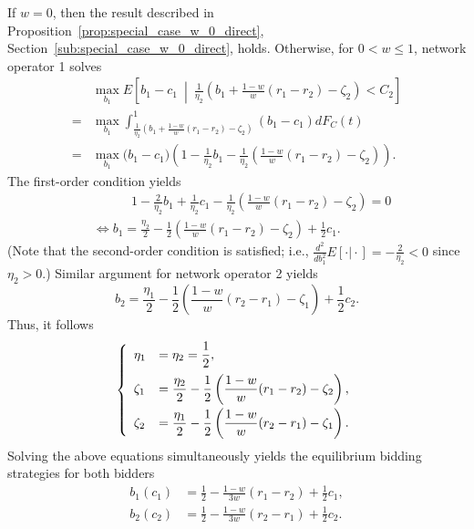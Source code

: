 If $w=0$, then the result described in Proposition~\ref{prop:special_case_w_0_direct}, Section~\ref{sub:special_case_w_0_direct}, holds. Otherwise, for $0<w\le 1$, network operator 1 solves
\begin{align}
	&\max_{b_1} E \left[ b_1-c_1 \:\middle\vert\: \frac{1}{\eta_2}\left( b_1 + \frac{1-w}{w}(r_1-r_2)-\zeta_2 \right) < C_2 \right] \nonumber\\
	= &\max_{b_1}\int_{\frac{1}{\eta_2}(b_1 + \frac{1-w}{w}(r_1-r_2)-\zeta_2)}^{1} (b_1-c_1)dF_C(t)\nonumber\\
	= &\max_{b_1} \bigg(b_1-c_1\bigg) \left(1-\frac{1}{\eta_2}b_1-\frac{1}{\eta_2} \left(\frac{1-w}{w}(r_1-r_2)-\zeta_2 \right) \right).
	\label{eq:pcomp_exp_utility_w_1_direct}
\end{align}
The first-order condition yields
\begin{align}
	&\qquad\quad 1 - \frac{2}{\eta_2}b_1 + \frac{1}{\eta_2}c_1 - \frac{1}{\eta_2}\left( \frac{1-w}{w}(r_1-r_2) - \zeta_2 \right) = 0 \nonumber\\
	&\iff b_1 = \frac{\eta_2}{2} - \frac{1}{2}\left( \frac{1-w}{w}(r_1-r_2) - \zeta_2 \right) + \frac{1}{2}c_1.
\end{align}
(Note that the second-order condition is satisfied; i.e., $\frac{d^2}{db^2_1}E[\cdot\vert\cdot] = -\frac{2}{\eta_2} < 0$ since $\eta_2>0$.) Similar argument for network operator 2 yields
\begin{equation}
	b_2 = \frac{\eta_1}{2} - \frac{1}{2}\left( \frac{1-w}{w}(r_2-r_1) - \zeta_1 \right) + \frac{1}{2}c_2.
\end{equation}
Thus, it follows
\begin{equation}
	\left\{
	\begin{array}{l l}
		\eta_1 &= \eta_2 = \displaystyle\frac{1}{2},\\[2ex]
		\zeta_1 &= \displaystyle\frac{\eta_2}{2} - \displaystyle\frac{1}{2}\left( \displaystyle\frac{1-w}{w}(r_1-r_2) - \zeta_2 \right),\\[2ex]
		\zeta_2 &= \displaystyle\frac{\eta_1}{2} - \displaystyle\frac{1}{2}\left( \displaystyle\frac{1-w}{w}(r_2-r_1) - \zeta_1 \right).
	\end{array}\right.
\end{equation}
Solving the above equations simultaneously yields the equilibrium bidding strategies for both bidders
\begin{align}
	b_1(c_1) &= \frac{1}{2} - \frac{1-w}{3w}(r_1-r_2) + \frac{1}{2}c_1,\\[2ex]
	b_2(c_2) &= \frac{1}{2} - \frac{1-w}{3w}(r_2-r_1) + \frac{1}{2}c_2.
\end{align}
